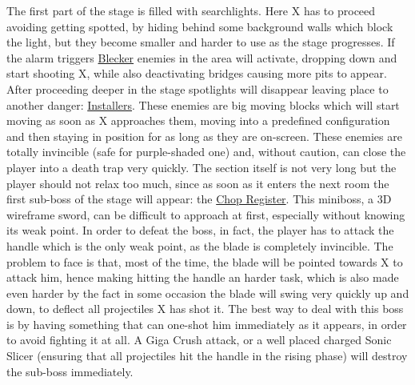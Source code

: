 The first part of the stage is filled with searchlights. Here X has to proceed avoiding getting spotted, by hiding behind some background walls which block the light, but they become smaller and harder to use as the stage progresses. If the alarm triggers \hyperlink{enem:Blecker}{Blecker} enemies in the area will activate, dropping down and start shooting X, while also deactivating bridges causing more pits to appear. After proceeding deeper in the stage spotlights will disappear leaving place to another danger: \hyperlink{enem:Installer}{Installers}. These enemies are big moving blocks which will start moving as soon as X approaches them, moving into a predefined configuration and then staying in position for as long as they are on-screen. These enemies are totally invincible (safe for purple-shaded one) and, without caution, can close the player into a death trap very quickly. The section itself is not very long but the player should not relax too much, since as soon as it enters the next room the first sub-boss of the stage will appear: the \hyperlink{miniboss:Chop_Register}{Chop Register}. This miniboss, a 3D wireframe sword, can be difficult to approach at first, especially without knowing its weak point. In order to defeat the boss, in fact, the player has to attack the handle which is the only weak point, as the blade is completely invincible. The problem to face is that, most of the time, the blade will be pointed towards X to attack him, hence making hitting the handle an harder task, which is also made even harder by the fact in some occasion the blade will swing very quickly up and down, to deflect all projectiles X has shot it. The best way to deal with this boss is by having something that can one-shot him immediately as it appears, in order to avoid fighting it at all. A Giga Crush attack, or a well placed charged Sonic Slicer (ensuring that all projectiles hit the handle in the rising phase) will destroy the sub-boss immediately.

